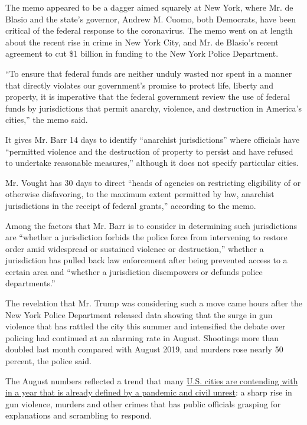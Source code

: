 The memo appeared to be a dagger aimed squarely at New York, where Mr.
de Blasio and the state's governor, Andrew M. Cuomo, both Democrats,
have been critical of the federal response to the coronavirus. The memo
went on at length about the recent rise in crime in New York City, and
Mr. de Blasio's recent agreement to cut \$1 billion in funding to the
New York Police Department.

``To ensure that federal funds are neither unduly wasted nor spent in a
manner that directly violates our government's promise to protect life,
liberty and property, it is imperative that the federal government
review the use of federal funds by jurisdictions that permit anarchy,
violence, and destruction in America's cities,'' the memo said.

It gives Mr. Barr 14 days to identify ``anarchist jurisdictions'' where
officials have ``permitted violence and the destruction of property to
persist and have refused to undertake reasonable measures,'' although it
does not specify particular cities.

Mr. Vought has 30 days to direct ``heads of agencies on restricting
eligibility of or otherwise disfavoring, to the maximum extent permitted
by law, anarchist jurisdictions in the receipt of federal grants,''
according to the memo.

Among the factors that Mr. Barr is to consider in determining such
jurisdictions are ``whether a jurisdiction forbids the police force from
intervening to restore order amid widespread or sustained violence or
destruction,'' whether a jurisdiction has pulled back law enforcement
after being prevented access to a certain area and ``whether a
jurisdiction disempowers or defunds police departments.''

The revelation that Mr. Trump was considering such a move came hours
after the New York Police Department released data showing that the
surge in gun violence that has rattled the city this summer and
intensified the debate over policing had continued at an alarming rate
in August. Shootings more than doubled last month compared with August
2019, and murders rose nearly 50 percent, the police said.

The August numbers reflected a trend that many
\href{https://www.nytimes3xbfgragh.onion/2020/08/11/us/homicides-crime-kansas-city-coronavirus.html}{U.S.
cities are contending with in a year that is already defined by a
pandemic and civil unrest}: a sharp rise in gun violence, murders and
other crimes that has public officials grasping for explanations and
scrambling to respond.

